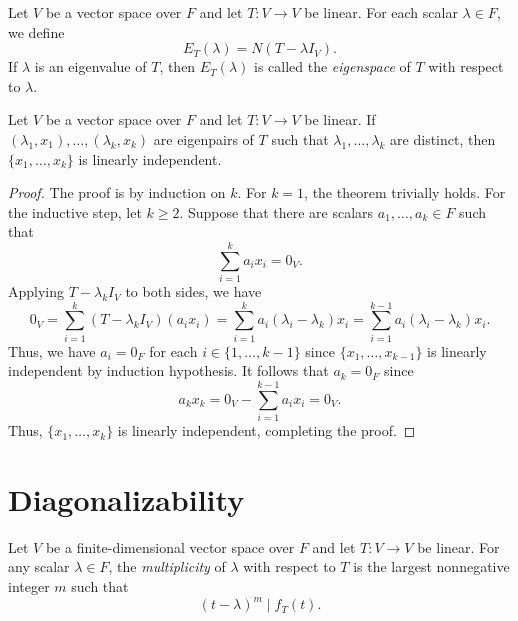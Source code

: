 \begin{definition}
  Let $V$ be a vector space over $F$ and let $T: V \to V$ be linear.
  For each scalar $\lambda \in F$, we define
  \begin{equation*}
    E_T(\lambda) = N(T - \lambda I_V).
  \end{equation*}
  If $\lambda$ is an eigenvalue of $T$, then $E_T(\lambda)$ is called the
  \emph{eigenspace} of $T$ with respect to $\lambda$.
\end{definition}

\begin{theorem}
  Let $V$ be a vector space over $F$ and let $T: V \to V$ be linear.
  If $(\lambda_1, x_1), \dots, (\lambda_k, x_k)$ are eigenpairs of $T$ such
  that $\lambda_1, \dots, \lambda_k$ are distinct, then $\{x_1, \dots, x_k\}$
  is linearly independent.
\end{theorem}
\begin{proof}
  The proof is by induction on $k$.
  For $k = 1$, the theorem trivially holds.
  For the inductive step, let $k \geq 2$.
  Suppose that there are scalars $a_1, \dots, a_k \in F$ such that
  \begin{equation*}
    \sum_{i=1}^k a_ix_i = 0_V.
  \end{equation*}
  Applying $T - \lambda_k I_V$ to both sides, we have
  \begin{equation*}
    0_V
    = \sum_{i=1}^k (T - \lambda_k I_V)(a_ix_i)
    = \sum_{i=1}^k a_i(\lambda_i - \lambda_k)x_i
    = \sum_{i=1}^{k-1} a_i(\lambda_i - \lambda_k)x_i.
  \end{equation*}
  Thus, we have $a_i = 0_F$ for each $i \in \{1, \dots, k-1\}$ since
  $\{x_1, \dots, x_{k-1}\}$ is linearly independent by induction hypothesis.
  It follows that $a_k = 0_F$ since
  \begin{equation*}
    a_kx_k = 0_V - \sum_{i=1}^{k-1} a_ix_i = 0_V.
  \end{equation*}
  Thus, $\{x_1, \dots, x_k\}$ is linearly independent, completing the proof.
\end{proof}

\section{Diagonalizability}
\begin{definition}
  Let $V$ be a finite-dimensional vector space over $F$ and let $T: V \to V$ be
  linear.
  For any scalar $\lambda \in F$, the \emph{multiplicity} of $\lambda$ with
  respect to $T$ is the largest nonnegative integer $m$ such that
  \begin{equation*}
    (t-\lambda)^m \mid f_T(t).
  \end{equation*}
\end{definition}

